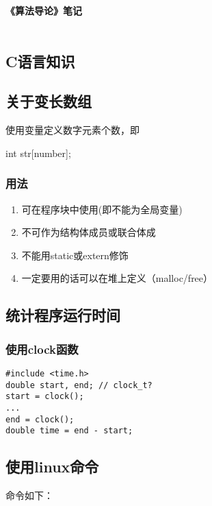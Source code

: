 
\usepackage[framed,numbered,autolinebreaks,useliterate]{/home/shigz/local/courease//qianrushi/mcode}
\lstset{basicstyle=\footnotesize\ttfamily,breaklines=true, language=C, xleftmargin=1em, xrightmargin=1em,  aboveskip=1em}


\begin{center}
    {\heiti{}\textbf{《算法导论》笔记}}\\  
\end{center}
\begin{spacing}{1.2}
\songti{}
\section{C语言知识}
\subsection{关于变长数组}
使用变量定义数字元素个数，即

\qquad int str[number];

\subsubsection{用法}
\begin{enumerate} [(1)]
    \item 可在程序块中使用(即不能为全局变量)
    \item 不可作为结构体成员或联合体成
    \item 不能用static或extern修饰
    \item 一定要用的话可以在堆上定义（malloc/free）
\end{enumerate}

\subsection{统计程序运行时间}
\subsubsection{使用clock函数}
\begin{lstlisting}
#include <time.h>
double start, end; // clock_t?
start = clock();
...
end = clock();
double time = end - start;
\end{lstlisting}

\subsection{使用linux命令}
命令如下：


\end{spacing}

